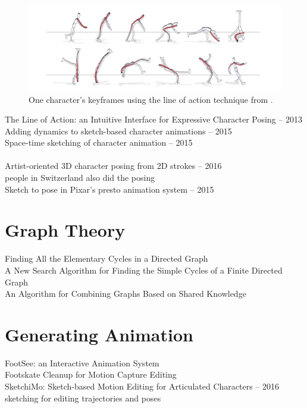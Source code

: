 \begin{figure}[!h]
\includegraphics[scale=0.4]{img/baseline}
\caption{One character's keyframes using the line of action technique from \citep{guay2013line}.}
\end{figure}

The Line of Action: an Intuitive Interface for Expressive Character Posing -- 2013\\
Adding dynamics to sketch-based character animations -- 2015\\
Space-time sketching of character animation -- 2015\\
\\
Artist-oriented 3D character posing from 2D strokes -- 2016\\
people in Switzerland also did the posing \\
Sketch to pose in Pixar's presto animation system -- 2015


\section{Graph Theory}
Finding All the Elementary Cycles in a Directed Graph\\
A New Search Algorithm for Finding the Simple Cycles of a Finite Directed Graph\\
An Algorithm for Combining Graphs Based on Shared Knowledge

\section{Generating Animation}
FootSee: an Interactive Animation System\\
Footskate Cleanup for Motion Capture Editing\\
SketchiMo: Sketch-based Motion Editing for Articulated Characters -- 2016\\
sketching for editing trajectories and poses

